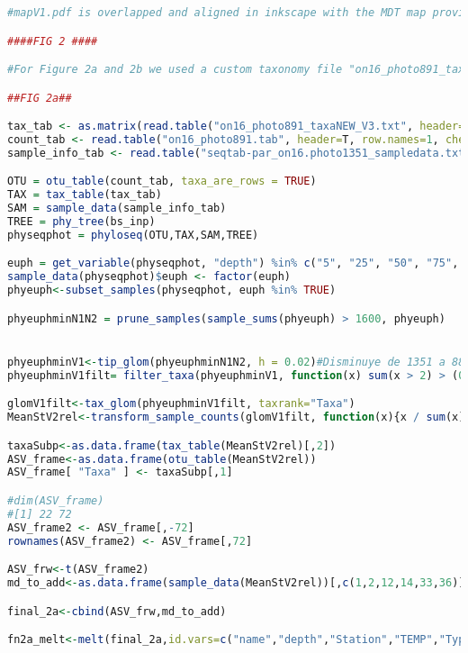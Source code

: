 \documentclass{article}
\begin{document}
\begin{lstlisting}[language=R,caption={N1N2figscripts}]
#mapV1.pdf is overlapped and aligned in inkscape with the MDT map provided by Alice Della Penna and Peter Gaube. Colors were modified for better visualization when overlapped with the MDT.

####FIG 2 ####

#For Figure 2a and 2b we used a custom taxonomy file "on16_photo891_taxaNEW_V3"

##FIG 2a##

tax_tab <- as.matrix(read.table("on16_photo891_taxaNEW_V3.txt", header=T, row.names=1, check.names=F, na.strings="", sep="\t"))
count_tab <- read.table("on16_photo891.tab", header=T, row.names=1, check.names=F)
sample_info_tab <- read.table("seqtab-par_on16.photo1351_sampledata.txt", header=T, row.names=1, check.names=F, sep ="\t")

OTU = otu_table(count_tab, taxa_are_rows = TRUE)
TAX = tax_table(tax_tab)
SAM = sample_data(sample_info_tab)
TREE = phy_tree(bs_inp) 
physeqphot = phyloseq(OTU,TAX,SAM,TREE)

euph = get_variable(physeqphot, "depth") %in% c("5", "25", "50", "75", "100")
sample_data(physeqphot)$euph <- factor(euph)
phyeuph<-subset_samples(physeqphot, euph %in% TRUE)

phyeuphminN1N2 = prune_samples(sample_sums(phyeuph) > 1600, phyeuph)


phyeuphminV1<-tip_glom(phyeuphminN1N2, h = 0.02)#Disminuye de 1351 a 886
phyeuphminV1filt= filter_taxa(phyeuphminV1, function(x) sum(x > 2) > (0.015*length(x)), TRUE)

glomV1filt<-tax_glom(phyeuphminV1filt, taxrank="Taxa")
MeanStV2rel<-transform_sample_counts(glomV1filt, function(x){x / sum(x)})

taxaSubp<-as.data.frame(tax_table(MeanStV2rel)[,2])
ASV_frame<-as.data.frame(otu_table(MeanStV2rel))
ASV_frame[ "Taxa" ] <- taxaSubp[,1]

#dim(ASV_frame)
#[1] 22 72
ASV_frame2 <- ASV_frame[,-72]
rownames(ASV_frame2) <- ASV_frame[,72]

ASV_frw<-t(ASV_frame2)
md_to_add<-as.data.frame(sample_data(MeanStV2rel))[,c(1,2,12,14,33,36)]

final_2a<-cbind(ASV_frw,md_to_add)

fn2a_melt<-melt(final_2a,id.vars=c("name","depth","Station","TEMP","Type","position"), measure.vars = c("Diatoms","Bolidophyceae","Dictyochophyceae","Pelagophyceae","Chrysophyceae","Micromonas","Bathycoccus","OstreococcusI","OstreococcusII","Cryptophyceae","Prymnesiophyceae","Rappemonad", "ASV357","Other plastid","ProchlorococcusHLI","ProchlorococcusHLII","ProchlorococcusLLI","SynechococcusI","SynechococcusIV","SynechococcusII","Other Cyanobacteria","Not assigned"))


\end{lstlisting}
\end{document}
